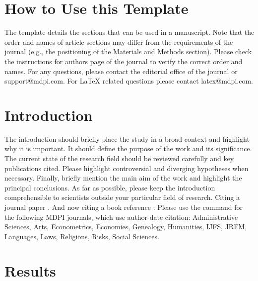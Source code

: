 \documentclass[journal,article,submit,moreauthors,pdftex]{Definitions/mdpi}
\begin{document}

\setcounter{section}{-1} %
\section{How to Use this Template}
The template details the sections that can be used in a manuscript. Note that the order and names of article sections may differ from the requirements of the journal (e.g., the positioning of the Materials and Methods section). Please check the instructions for authors page of the journal to verify the correct order and names. For any questions, please contact the editorial office of the journal or support@mdpi.com. For LaTeX related questions please contact latex@mdpi.com.

\section{Introduction}
The introduction should briefly place the study in a broad context and highlight why it is important. It should define the purpose of the work and its significance. The current state of the research field should be reviewed carefully and key publications cited. Please highlight controversial and diverging hypotheses when necessary. Finally, briefly mention the main aim of the work and highlight the principal conclusions. As far as possible, please keep the introduction comprehensible to scientists outside your particular field of research. Citing a journal paper \cite{ref-journal}. And now citing a book reference \cite{ref-book}. Please use the command \citep{ref-journal} for the following MDPI journals, which use author-date citation: Administrative Sciences, Arts, Econometrics, Economies, Genealogy, Humanities, IJFS, JRFM, Languages, Laws, Religions, Risks, Social Sciences.
 
\section{Results}
\end{document}
